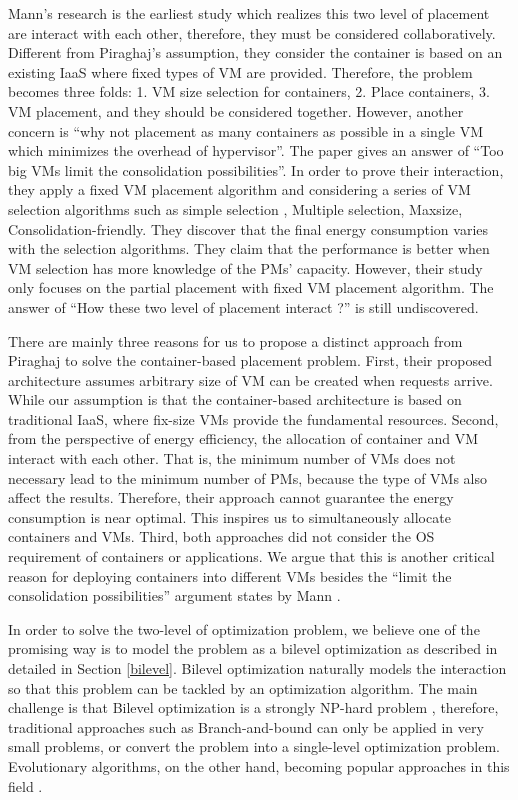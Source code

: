 Mann's research \cite{Mann:2016hx} is the earliest study which realizes this two level of placement are interact with each other, therefore, they must be considered collaboratively. Different from Piraghaj's assumption, they consider the container is based on an existing IaaS where fixed types of VM are provided. Therefore, the problem becomes three folds: 1. VM size selection for containers, 2. Place containers, 3. VM placement, and they should be considered together. However, another concern is ``why not placement as many containers as possible in a single VM which minimizes the overhead of hypervisor''. The paper gives an answer of ``Too big VMs limit the consolidation possibilities''.  In order to prove their interaction, they apply a fixed VM placement algorithm and considering a series of VM selection algorithms such as simple selection \cite{Ganesan:2012eb},  Multiple selection, Maxsize, Consolidation-friendly. They discover that the final energy consumption varies with the selection algorithms. They claim that the performance is better when VM selection has more knowledge of the PMs' capacity. However, their study only focuses on the partial placement with fixed VM placement algorithm. The answer of ``How these two level of placement interact ?'' is still undiscovered.

There are mainly three reasons for us to propose a distinct approach from Piraghaj \cite{Piraghaj:2016bw} to solve the container-based placement problem. First, their proposed architecture assumes arbitrary size of VM can be created when requests arrive. While our assumption is that the container-based architecture is based on traditional IaaS, where fix-size VMs provide the fundamental resources. Second, from the perspective of energy efficiency, the allocation of container and VM interact with each other. That is, the minimum number of VMs does not necessary lead to the minimum number of PMs, because the type of VMs also affect the results. Therefore, their approach cannot guarantee the energy consumption is near optimal. This inspires us to simultaneously allocate containers and VMs. Third, both approaches did not consider the OS requirement of containers or applications. We argue that this is another critical reason for deploying containers into different VMs besides the ``limit the consolidation possibilities'' argument states by Mann \cite{Mann:2016hx}.

In order to solve the two-level of optimization problem, we believe one of the promising way is to model the problem as a bilevel optimization \cite{Colson:2007bu} as described in detailed in Section \ref{bilevel}. Bilevel optimization naturally models the interaction so that this problem can be tackled by an optimization algorithm. The main challenge is that Bilevel optimization is a strongly NP-hard problem \cite{Sinha:2013tn}, therefore, traditional approaches such as Branch-and-bound \cite{Bard:1982gs} can only be applied in very small problems, or convert the problem into a single-level optimization problem.  Evolutionary algorithms, on the other hand, becoming popular approaches in this field \cite{Wang:2005fa, Sinha:2013tn}. 

